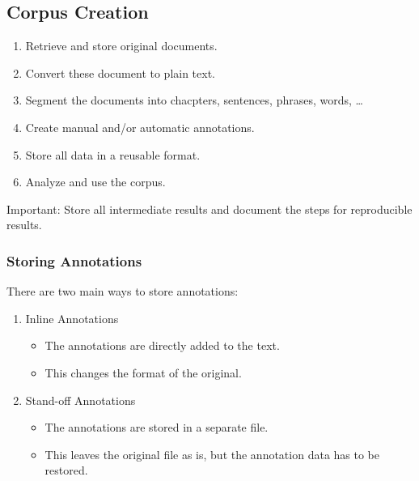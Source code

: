         \subsection{Corpus Creation} %
            \begin{enumerate}
            	\item Retrieve and store original documents.
            	\item Convert these document to plain text.
            	\item Segment the documents into chacpters, sentences, phrases, words, \dots
            	\item Create manual and/or automatic annotations.
            	\item Store all data in a reusable format.
            	\item Analyze and use the corpus.
            \end{enumerate}
        	Important: Store all intermediate results and document the steps for reproducible results.

            \subsubsection{Storing Annotations} %
                There are two main ways to store annotations:
                \begin{enumerate}
                	\item Inline Annotations
                		\begin{itemize}
                			\item The annotations are directly added to the text.
                			\item This changes the format of the original.
                		\end{itemize}
                	\item Stand-off Annotations
                		\begin{itemize}
                			\item The annotations are stored in a separate file.
                			\item This leaves the original file as is, but the annotation data has to be restored.
                		\end{itemize}
                \end{enumerate}

